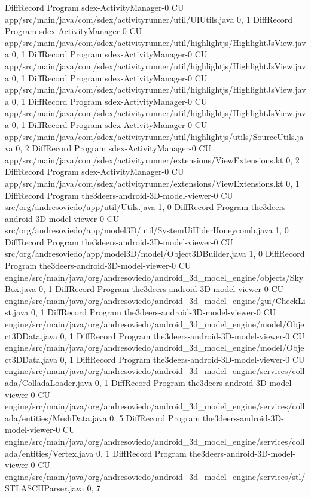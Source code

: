 DiffRecord Program sdex-ActivityManager-0 CU app/src/main/java/com/sdex/activityrunner/util/UIUtils.java  {0, 1}
DiffRecord Program sdex-ActivityManager-0 CU app/src/main/java/com/sdex/activityrunner/util/highlightjs/HighlightJsView.java  {0, 1}
DiffRecord Program sdex-ActivityManager-0 CU app/src/main/java/com/sdex/activityrunner/util/highlightjs/HighlightJsView.java  {0, 1}
DiffRecord Program sdex-ActivityManager-0 CU app/src/main/java/com/sdex/activityrunner/util/highlightjs/HighlightJsView.java  {0, 1}
DiffRecord Program sdex-ActivityManager-0 CU app/src/main/java/com/sdex/activityrunner/util/highlightjs/HighlightJsView.java  {0, 1}
DiffRecord Program sdex-ActivityManager-0 CU app/src/main/java/com/sdex/activityrunner/util/highlightjs/utils/SourceUtils.java  {0, 2}
DiffRecord Program sdex-ActivityManager-0 CU app/src/main/java/com/sdex/activityrunner/extensions/ViewExtensions.kt  {0, 2}
DiffRecord Program sdex-ActivityManager-0 CU app/src/main/java/com/sdex/activityrunner/extensions/ViewExtensions.kt  {0, 1}
DiffRecord Program the3deers-android-3D-model-viewer-0 CU src/org/andresoviedo/app/util/Utils.java  {1, 0}
DiffRecord Program the3deers-android-3D-model-viewer-0 CU src/org/andresoviedo/app/model3D/util/SystemUiHiderHoneycomb.java  {1, 0}
DiffRecord Program the3deers-android-3D-model-viewer-0 CU src/org/andresoviedo/app/model3D/model/Object3DBuilder.java  {1, 0}
DiffRecord Program the3deers-android-3D-model-viewer-0 CU engine/src/main/java/org/andresoviedo/android_3d_model_engine/objects/SkyBox.java  {0, 1}
DiffRecord Program the3deers-android-3D-model-viewer-0 CU engine/src/main/java/org/andresoviedo/android_3d_model_engine/gui/CheckList.java  {0, 1}
DiffRecord Program the3deers-android-3D-model-viewer-0 CU engine/src/main/java/org/andresoviedo/android_3d_model_engine/model/Object3DData.java  {0, 1}
DiffRecord Program the3deers-android-3D-model-viewer-0 CU engine/src/main/java/org/andresoviedo/android_3d_model_engine/model/Object3DData.java  {0, 1}
DiffRecord Program the3deers-android-3D-model-viewer-0 CU engine/src/main/java/org/andresoviedo/android_3d_model_engine/services/collada/ColladaLoader.java  {0, 1}
DiffRecord Program the3deers-android-3D-model-viewer-0 CU engine/src/main/java/org/andresoviedo/android_3d_model_engine/services/collada/entities/MeshData.java  {0, 5}
DiffRecord Program the3deers-android-3D-model-viewer-0 CU engine/src/main/java/org/andresoviedo/android_3d_model_engine/services/collada/entities/Vertex.java  {0, 1}
DiffRecord Program the3deers-android-3D-model-viewer-0 CU engine/src/main/java/org/andresoviedo/android_3d_model_engine/services/stl/STLASCIIParser.java  {0, 7}
